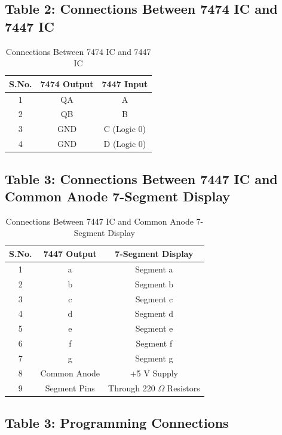 \documentclass[12pt,a4paper]{article}
\begin{document}
\subsection*{Table 2: Connections Between 7474 IC and 7447 IC}

\begin{table}[h]
\centering
\begin{tabular}{|c|c|c|}
\hline
\textbf{S.No.} & \textbf{7474 Output} & \textbf{7447 Input} \\ \hline
1 & QA & A \\ \hline
2 & QB & B \\ \hline
3 & GND & C (Logic 0) \\ \hline
4 & GND & D (Logic 0) \\ \hline
\end{tabular}
\caption{Connections Between 7474 IC and 7447 IC}
\label{tab:7474_7447}
\end{table}


\subsection*{Table 3: Connections Between 7447 IC and Common Anode 7-Segment Display}

\begin{table}[h]
\centering
\begin{tabular}{|c|c|c|}
\hline
\textbf{S.No.} & \textbf{7447 Output} & \textbf{7-Segment Display} \\ \hline
1 & a & Segment a \\ \hline
2 & b & Segment b \\ \hline
3 & c & Segment c \\ \hline
4 & d & Segment d \\ \hline
5 & e & Segment e \\ \hline
6 & f & Segment f \\ \hline
7 & g & Segment g \\ \hline
8 & Common Anode & +5 V Supply \\ \hline
9 & Segment Pins & Through 220 $\Omega$ Resistors \\ \hline
\end{tabular}
\caption{Connections Between 7447 IC and Common Anode 7-Segment Display}
\label{tab:7447_7segment}
\end{table}

\subsection*{Table 3: Programming Connections}
\end{document}
